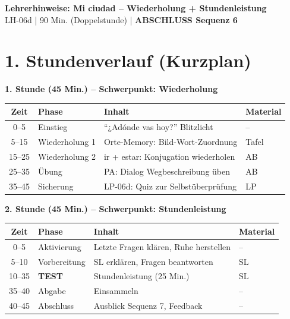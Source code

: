 \documentclass[11pt, a4paper]{article}
\newcommand{\fachfarbe}{spanisch}
\newcommand{\thema}{Mi ciudad -- Wiederholung + Stundenleistung}
\newcommand{\sequenz}{06}
\newcommand{\block}{d}
\newcommand{\dauer}{90 Min. (Doppelstunde)}
\begin{document}
\begin{center}
    {\Large\bfseries\textcolor{\fachfarbe}{Lehrerhinweise: \thema}}\\[0.3em]
    {\normalsize LH-\sequenz\block{} | \dauer{} | \textbf{ABSCHLUSS Sequenz 6}}
\end{center}

\vspace{10pt}

\section*{1. Stundenverlauf (Kurzplan)}

\textbf{1. Stunde (45 Min.) -- Schwerpunkt: Wiederholung}

\begin{tabularx}{\textwidth}{|c|l|X|l|}
\hline
\textbf{Zeit} & \textbf{Phase} & \textbf{Inhalt} & \textbf{Material} \\
\hline
0--5 & Einstieg & ``¿Adónde vas hoy?'' Blitzlicht & -- \\
\hline
5--15 & Wiederholung 1 & Orte-Memory: Bild-Wort-Zuordnung & Tafel \\
\hline
15--25 & Wiederholung 2 & ir + estar: Konjugation wiederholen & AB \\
\hline
25--35 & Übung & PA: Dialog Wegbeschreibung üben & AB \\
\hline
35--45 & Sicherung & LP-06d: Quiz zur Selbstüberprüfung & LP \\
\hline
\end{tabularx}

\vspace{1em}

\textbf{2. Stunde (45 Min.) -- Schwerpunkt: Stundenleistung}

\begin{tabularx}{\textwidth}{|c|l|X|l|}
\hline
\textbf{Zeit} & \textbf{Phase} & \textbf{Inhalt} & \textbf{Material} \\
\hline
0--5 & Aktivierung & Letzte Fragen klären, Ruhe herstellen & -- \\
\hline
5--10 & Vorbereitung & SL erklären, Fragen beantworten & SL \\
\hline
10--35 & \textbf{TEST} & Stundenleistung (25 Min.) & SL \\
\hline
35--40 & Abgabe & Einsammeln & -- \\
\hline
40--45 & Abschluss & Ausblick Sequenz 7, Feedback & -- \\
\hline
\end{tabularx}
\end{document}
